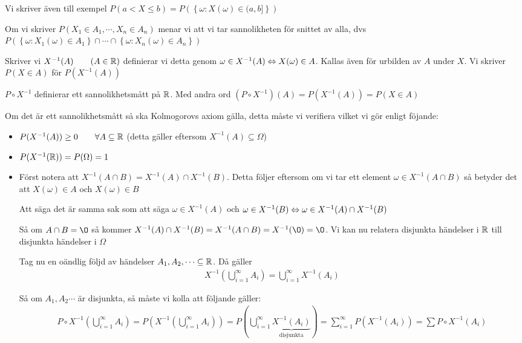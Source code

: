 \par\bigskip
\noindent Vi skriver även till exempel $P(a<X\leq b) = P(\left\{\omega:X(\omega)\in(a,b]\right\})$
\par\bigskip
\noindent Om vi skriver $P(X_1\in A_1,\cdots,X_n\in A_n)$ menar vi att vi tar sannolikheten för snittet av alla, dvs $P(\left\{\omega: X_1(\omega)\in A_1\right\}\cap\cdots\cap\left\{\omega:X_n(\omega)\in A_n\right\})$
\par\bigskip
\noindent Skriver vi $X^{-1}(A)\qquad(A\in\mathbb{R})$ definierar vi detta genom $\omega\in X^{-1}(A)\Leftrightarrow X(\omega)\in A$. Kallas även för urbilden av $A$ under $X$. Vi skriver $P(X\in A)$ för $P(X^{-1}(A))$
\par\bigskip
\noindent $P\circ X^{-1}$ definierar ett sannolikhetsmått på $\mathbb{R}$. Med andra ord $(P\circ X^{-1})(A) = P(X^{-1}(A)) = P(X\in A)$\par
\noindent Om det är ett sannolikhetsmått så ska Kolmogorovs axiom gälla, detta måste vi verifiera vilket vi gör enligt föjande:\par
\begin{itemize}
  \item $P(X^{-1}(A))\geq0\qquad\forall A\subseteq\mathbb{R}$ (detta gäller eftersom $X^{-1}(A)\subseteq\Omega$)
  \item $P(X^{-1}(\mathbb{R})) = P(\Omega) = 1$
  \item Först notera att $X^{-1}(A\cap B) = X^{-1}(A)\cap X^{-1}(B)$. Detta följer eftersom om vi tar ett element $\omega\in X^{-1}(A\cap B)$ så betyder det att $X(\omega)\in A$ och $X(\omega)\in B$
    \par
    \noindent Att säga det är samma sak som att säga $\omega\in X^{-1}(A)$ och $\omega\in X^{-1}(B)\Leftrightarrow \omega\in X^{-1}(A)\cap X^{-1}(B)$\par\bigskip
    \noindent Så om $A\cap B = \O$ så kommer $X^{-1}(A)\cap X^{-1}(B) = X^{-1}(A\cap B) = X^{-1}(\O) = \O$. Vi kan nu relatera disjunkta händelser i $\mathbb{R}$ till disjunkta händelser i $\Omega$\par
    \noindent Tag nu en oändlig följd av händelser $A_1, A_2,\cdots\subseteq\mathbb{R}$. Då gäller
    \begin{equation*}
      \begin{gathered}
        X^{-1}\left(\bigcup_{i=1}^{\infty}A_i\right) = \bigcup_{i=1}^{\infty}X^{-1}(A_i)
      \end{gathered}
    \end{equation*}\par
    \noindent Så om $A_1,A_2\cdots$ är disjunkta, så måste vi kolla att följande gäller:
    \begin{equation*}
      \begin{gathered}
        P\circ X^{-1}\left(\bigcup_{i=1}^{\infty}A_i\right) = P(X^{-1}\left(\bigcup_{i=1}^{\infty}A_i\right)) = P\left(\bigcup_{i=1}^{\infty}\underbrace{X^{-1}(A_i)}_{\text{disjunkta}}\right) = \sum_{i=1}^{\infty}P(X^{-1}(A_i)) = \sum P\circ X^{-1}(A_i)
      \end{gathered}
    \end{equation*}
\end{itemize}

